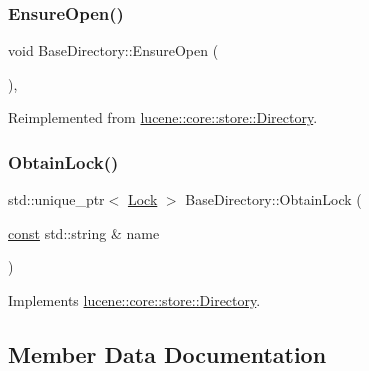 \subsubsection{\texorpdfstring{Ensure\+Open()}{EnsureOpen()}}
{\footnotesize\ttfamily void Base\+Directory\+::\+Ensure\+Open (\begin{DoxyParamCaption}{ }\end{DoxyParamCaption})\hspace{0.3cm}{\ttfamily [protected]}, {\ttfamily [virtual]}}



Reimplemented from \mbox{\hyperlink{classlucene_1_1core_1_1store_1_1Directory_a908bb5ccea0c5fee6d27eedcca686a9f}{lucene\+::core\+::store\+::\+Directory}}.

\mbox{\label{classlucene_1_1core_1_1store_1_1BaseDirectory_a42ea39f7b8b99972e6e39710e0563037}} 
\subsubsection{\texorpdfstring{Obtain\+Lock()}{ObtainLock()}}
{\footnotesize\ttfamily std\+::unique\+\_\+ptr$<$ \mbox{\hyperlink{classlucene_1_1core_1_1store_1_1Lock}{Lock}} $>$ Base\+Directory\+::\+Obtain\+Lock (\begin{DoxyParamCaption}\item[{\mbox{\hyperlink{ZlibCrc32_8h_a2c212835823e3c54a8ab6d95c652660e}{const}} std\+::string \&}]{name }\end{DoxyParamCaption})\hspace{0.3cm}{\ttfamily [virtual]}}



Implements \mbox{\hyperlink{classlucene_1_1core_1_1store_1_1Directory_afe0348fa3979da64289fbd4c96db5845}{lucene\+::core\+::store\+::\+Directory}}.



\subsection{Member Data Documentation}
\mbox{\label{classlucene_1_1core_1_1store_1_1BaseDirectory_aa05ba27e4262493ec57cabd5ed0f330a}} 

